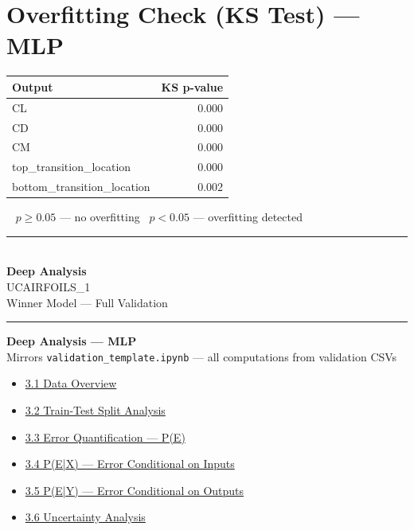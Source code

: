 \documentclass[9pt,a4paper]{article}
\begin{document}
\section{Overfitting Check (KS Test) --- MLP}
\begin{minipage}{\linewidth}
\renewcommand{\arraystretch}{1.15}
\begin{tabular}{|l|r|}
  \hline\textbf{Output} & \textbf{KS p-value} \\ \hline
  CL & \cellcolor{failred}0.000 \\ \hline
  CD & \cellcolor{failred}0.000 \\ \hline
  CM & \cellcolor{failred}0.000 \\ \hline
  top\_transition\_location & \cellcolor{failred}0.000 \\ \hline
  bottom\_transition\_location & \cellcolor{failred}0.002 \\ \hline
\end{tabular}
\par\vspace{4pt}
{\footnotesize \colorbox{passgreen}{\ } $p\geq 0.05$ --- no overfitting\enspace \colorbox{failred}{\ } $p<0.05$ --- overfitting detected}
\end{minipage}
\clearpage
\thispagestyle{empty}
\vspace*{\fill}
\begin{center}
  \textcolor{sepgray}{\rule{0.40\linewidth}{1pt}}\\[20pt]
  {\Huge\bfseries\color{primary} Deep Analysis}\\[10pt]
  {\large\color{sepgray} UCAIRFOILS\_1}\\[6pt]
  {\normalsize\color{sepgray} Winner Model --- Full Validation}\\[20pt]
  \textcolor{sepgray}{\rule{0.40\linewidth}{1pt}}
\end{center}
\vspace*{\fill}
\clearpage
\label{sec:deepanalysis}
\begin{center}
  {\normalsize\bfseries\color{primary} Deep Analysis --- MLP}\\[2pt]
  {\small\color{sepgray} Mirrors \texttt{validation\_template.ipynb} --- all computations from validation CSVs}
\end{center}
\vspace{4pt}
\begin{itemize}[leftmargin=2em,itemsep=1pt,topsep=2pt]
  \item \hyperref[sec:d1]{3.1 Data Overview}
  \item \hyperref[sec:d2]{3.2 Train-Test Split Analysis}
  \item \hyperref[sec:d3]{3.3 Error Quantification --- P(E)}
  \item \hyperref[sec:d4]{3.4 P(E|X) --- Error Conditional on Inputs}
  \item \hyperref[sec:d5]{3.5 P(E|Y) --- Error Conditional on Outputs}
  \item \hyperref[sec:d6]{3.6 Uncertainty Analysis}
\end{itemize}
\end{document}

